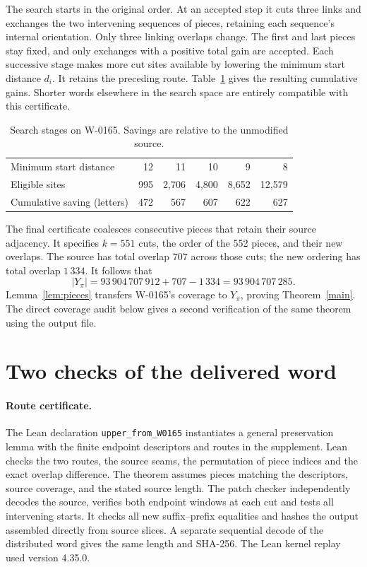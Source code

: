 \documentclass[11pt]{article}
\begin{document}
The search starts in the original order. At an accepted step it cuts three links and exchanges the two intervening sequences of pieces, retaining each sequence's internal orientation. Only three linking overlaps change. The first and last pieces stay fixed, and only exchanges with a positive total gain are accepted. Each successive stage makes more cut sites available by lowering the minimum start distance \(d_i\). It retains the preceding route. Table~\ref{search} gives the resulting cumulative gains. Shorter words elsewhere in the search space are entirely compatible with this certificate.

\begin{table}[ht]
\centering
\caption{Search stages on W-0165. Savings are relative to the unmodified source.}
\label{search}\smallskip
\begin{tabular}{@{}lrrrrr@{}}
\toprule
Minimum start distance & 12 & 11 & 10 & 9 & 8\\
Eligible sites & 995 & 2,706 & 4,800 & 8,652 & 12,579\\
Cumulative saving (letters) & 472 & 567 & 607 & 622 & 627\\
\bottomrule
\end{tabular}
\end{table}

The final certificate coalesces consecutive pieces that retain their source adjacency. It specifies \(k=551\) cuts, the order of the 552 pieces, and their new overlaps. The source has total overlap \(707\) across those cuts; the new ordering has total overlap \(1\,334\). It follows that
\[
 |Y_\pi|=93\,904\,707\,912 + 707 - 1\,334
        =93\,904\,707\,285 .
\]
Lemma~\ref{lem:pieces} transfers W-0165's coverage to \(Y_\pi\), proving Theorem~\ref{main}. The direct coverage audit below gives a second verification of the same theorem using the output file.

\section{Two checks of the delivered word}
\paragraph{Route certificate.}
The Lean declaration \texttt{upper\_from\_W0165} instantiates a general preservation lemma with the finite endpoint descriptors and routes in the supplement. Lean checks the two routes, the source seams, the permutation of piece indices and the exact overlap difference. The theorem assumes pieces matching the descriptors, source coverage, and the stated source length. The patch checker independently decodes the source, verifies both endpoint windows at each cut and tests all intervening starts. It checks all new suffix--prefix equalities and hashes the output assembled directly from source slices. A separate sequential decode of the distributed word gives the same length and SHA-256. The Lean kernel replay used version 4.35.0.
\end{document}
